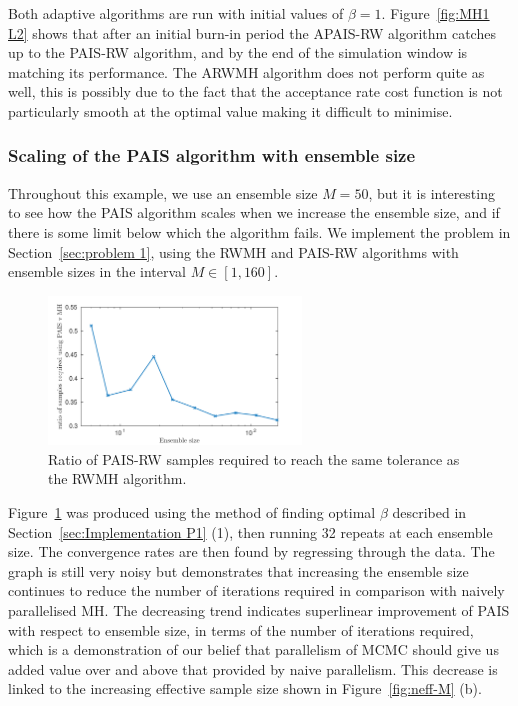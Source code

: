 \documentclass[final]{siamltex}
\begin{document}
Both adaptive algorithms are run with initial values of
$\beta=1$. Figure~\ref{fig:MH1 L2} shows that after an initial burn-in
period the APAIS-RW algorithm catches up to the PAIS-RW algorithm, and
by the end of the simulation window is matching its performance. The
ARWMH algorithm does not perform quite as well, this is possibly due
to the fact that the acceptance rate cost function is not particularly
smooth at the optimal value making it difficult to minimise.

\subsubsection{Scaling of the PAIS algorithm with ensemble size}

Throughout this example, we use an ensemble size $M=50$, but it is interesting to see how the PAIS algorithm scales when we increase the ensemble size, and if there is some limit below which the algorithm fails. We implement the problem in Section~\ref{sec:problem 1}, using the RWMH and PAIS-RW algorithms with ensemble sizes in the interval $M \in [1, 160]$.

\begin{figure}[h]
\begin{center}
\includegraphics[width=0.6\textwidth]{"figures/PAIS_saving"}
\caption{Ratio of PAIS-RW samples required to reach the same tolerance as the RWMH algorithm.}
\label{fig:PAIS_saving}
\end{center}
\end{figure}

Figure~\ref{fig:PAIS_saving} was produced using the method of finding
optimal $\beta$ described in Section~\ref{sec:Implementation P1} (1),
then running 32 repeats at each ensemble size. The convergence rates
are then found by regressing through the data. The graph is still very
noisy but demonstrates that increasing the ensemble size continues to
reduce the number of iterations required in comparison with naively
parallelised MH. The decreasing trend indicates superlinear improvement of PAIS with
respect to ensemble size, in terms of the number of iterations
required, which is a demonstration of our belief that parallelism of
MCMC should give us added value over and above that provided by naive parallelism. This decrease is linked to the increasing effective sample size shown in Figure~\ref{fig:neff-M} (b).
\end{document}
